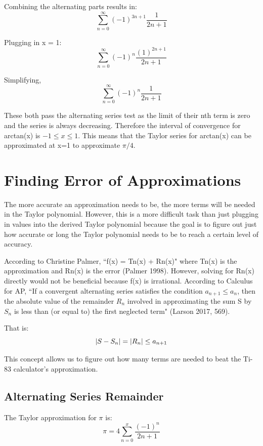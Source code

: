 \documentclass[12pt, titlepage]{article}
\begin{document}
Combining the alternating parts results in:
\begin{equation*}
    \sum_{n=0}^{\infty} (-1)^{3n+1} \frac{1}{2n+1}
\end{equation*}

Plugging in x = 1:
\begin{equation*}
    \sum_{n=0}^{\infty} (-1)^{n} \frac{(1)^{2n+1}}{2n+1}
\end{equation*}

Simplifying,
\begin{equation*}
    \sum_{n=0}^{\infty} (-1)^{n} \frac{1}{2n+1}
\end{equation*}

These both pass the alternating series test as the limit of their nth term is zero and the series is always decreasing. Therefore the interval of convergence for arctan(x) is \( -1 \leq x \leq 1 \). This means that the Taylor series for arctan(x) can be approximated at x=1 to approximate \(\pi/4\).

\section{Finding Error of Approximations}
The more accurate an approximation needs to be, the more terms will be needed in the Taylor polynomial. However, this is a more difficult task than just plugging in values into the derived Taylor polynomial because the goal is to figure out just how accurate or long the Taylor polynomial needs to be to reach a certain level of accuracy.

According to Christine Palmer, ``f(x) = Tn(x) + Rn(x)" where Tn(x) is the approximation and Rn(x) is the error (Palmer 1998). However, solving for Rn(x) directly would not be beneficial because f(x) is irrational.
According to Calculus for AP, ``If a convergent alternating series satisfies the condition \(a_{n+1} \leq a_{n} \), then the absolute value of the remainder \(R_{n}\) involved in approximating the sum S by \(S_{n}\) is less than (or equal to) the first neglected term" (Larson 2017, 569).

That is:
\begin{equation*}
  \abs{S - S_{n}} = \abs{R_{n}} \leq a_{n + 1}
\end{equation*}

This concept allows us to figure out how many terms are needed to beat the Ti-83 calculator's approximation.

\subsection{Alternating Series Remainder}
The Taylor approximation for \(\pi\) is:
\begin{equation*}
  \pi = 4\sum_{n=0}^{x}{ \frac{(-1)^n}{2n+1}}
\end{equation*}
\end{document}
